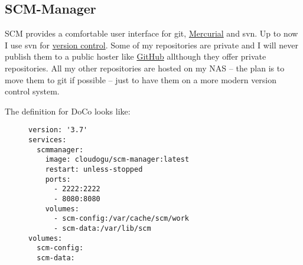 

\subsection{SCM-Manager}

\gls{SCM} provides a comfortable user interface for \gls{git},
\href{https://www.mercurial-scm.org}{Mercurial} and \gls{svn}. Up to now I use
\gls{svn} for \href{https://en.wikipedia.org/wiki/Version_control}{version control}.
Some of my repositories are private and I will never publish them to a public
hoster like \href{https://github.com}{GitHub} allthough they offer private
repositories. All my other repositories are hosted on my \gls{NAS} -- the plan
is to move them to \gls{git} if possible -- just to have them on a more modern
version control system.
\bigbreak

The definition for \gls{DoCo} looks like:

\begin{figure}[H]
    \scriptsize
    \centering
    \begin{BVerbatim}
version: '3.7'
services:
  scmmanager:
    image: cloudogu/scm-manager:latest
    restart: unless-stopped
    ports:
      - 2222:2222
      - 8080:8080
    volumes:
      - scm-config:/var/cache/scm/work
      - scm-data:/var/lib/scm
volumes:
  scm-config:
  scm-data:
    \end{BVerbatim}
\end{figure}

